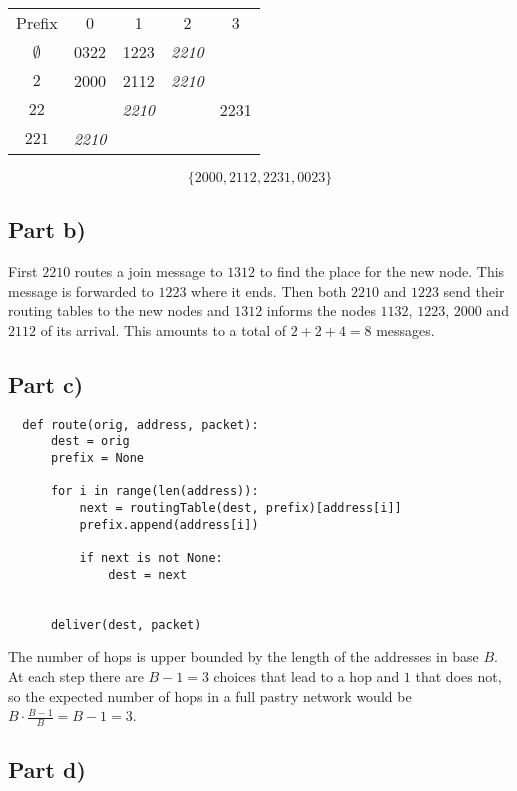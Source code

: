 \documentclass[10pt,a4paper]{article}
\begin{document}
\begin{tabular}{c|cccc}
  Prefix & 0 & 1 & 2 & 3\\
  $\emptyset$ & 0322 & 1223 & \emph{2210} & \\
  $2$ & 2000 & 2112 & \emph{2210} & \\
  $22$ &  & \emph{2210} &  & 2231\\
  $221$ & \emph{2210} &  &  & \\
\end{tabular}

\begin{equation*}
  \{ 2000, 2112, 2231, 0023 \}
\end{equation*}

\subsection*{Part b)}

First $2210$ routes a join message to $1312$ to find the place for the new node.
This message is forwarded to $1223$ where it ends.
Then both $2210$ and $1223$ send their routing tables to the new nodes and $1312$ informs the nodes $1132$, $1223$, $2000$ and $2112$ of its arrival.
This amounts to a total of $2 + 2 + 4 = 8$ messages.

\subsection*{Part c)}

\begin{verbatim}
  def route(orig, address, packet):
      dest = orig
      prefix = None

      for i in range(len(address)):
          next = routingTable(dest, prefix)[address[i]]
          prefix.append(address[i])

          if next is not None:
              dest = next


      deliver(dest, packet)
\end{verbatim}

The number of hops is upper bounded by the length of the addresses in base $B$.
At each step there are $B - 1 = 3$ choices that lead to a hop and $1$ that does not, so the expected number of hops in a full pastry network would be $B \cdot \frac{B - 1}{B} = B - 1 = 3$.

\subsection*{Part d)}
\end{document}
